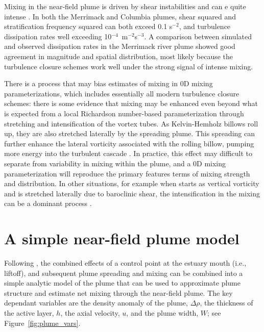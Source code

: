 \documentclass[12pt]{article}
\begin{document}

Mixing in the near-field plume is driven by shear instabilities and can  e quite intense \citep{macdonald.ea:07}. In both the Merrimack and Columbia plumes, shear squared and stratification frequency squared can both exceed 0.1 s$^{-2}$, and turbulence dissipation rates well exceeding 10$^{-4}$~m$^{-2}$s$^{-3}$. A comparison between simulated and observed dissipation rates in the Merrimack river plume showed good agreement in magnitude and spatial distribution, most likely because the turbulence closure schemes work well under the strong signal of intense mixing. 

There is a process that may bias estimates of mixing in 0D mixing parameterizations, which includes essentially all modern turbulence closure schemes: there is some evidence that mixing may be enhanced even beyond what is expected from a local Richardson number-based parameterization through stretching and intensification of the vortex tubes. As Kelvin-Hemholz billows roll up, they are also stretched laterally by the spreading plume. This spreading can further enhance the lateral vorticity associated with the rolling billow, pumping more energy into the turbulent cascade \citep{macdonald.chen:12}. In practice, this effect may difficult to separate from variability in mixing within the plume, and a 0D mixing parameterization will reproduce the primary features terms of mixing strength and distribution. In other situations, for example when starts as vertical vorticity and is stretched laterally due to baroclinic shear, the intensification in the mixing can be a dominant process \citep[e.g.,][]{farmer.ea:02}.

\section{A simple near-field plume model}

Following \citep{hetland:10a}, the combined effects of a control point at the estuary mouth (i.e., liftoff), and subsequent plume spreading and mixing can be combined into a simple analytic model of the plume that can be used to approximate plume structure and estimate net mixing through the near-field plume. The key dependant variables are the density anomaly of the plume, $\Delta\rho$, the thickness of the active layer, $h$, the axial velocity, $u$, and the plume width, $W$; see Figure~\ref{fig:plume_vars}.
\end{document}
